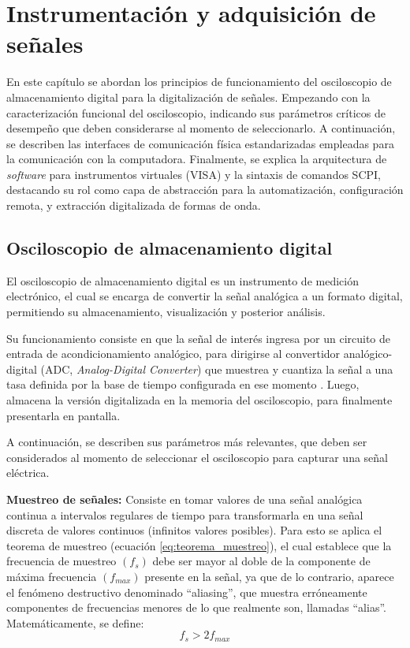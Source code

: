 \newpage
\chapter{Instrumentación y adquisición de señales}
\vspace{3\baselineskip}

En este capítulo se abordan los principios de funcionamiento del osciloscopio de almacenamiento digital para la digitalización de señales. Empezando con la caracterización funcional del osciloscopio, indicando sus parámetros críticos de desempeño que deben considerarse al momento de seleccionarlo. A continuación, se describen las interfaces de comunicación física estandarizadas empleadas para la comunicación con la computadora. Finalmente, se explica la arquitectura de \emph{software} para instrumentos virtuales (VISA) y la sintaxis de comandos SCPI, destacando su rol como capa de abstracción para la automatización, configuración remota, y extracción digitalizada de formas de onda.

\section{Osciloscopio de almacenamiento digital}
\vspace{3\baselineskip}

El osciloscopio de almacenamiento digital es un instrumento de medición electrónico, el cual se encarga de convertir la señal analógica a un formato digital, permitiendo su almacenamiento, visualización y posterior análisis.

Su funcionamiento consiste en que la señal de interés ingresa por un circuito de entrada de acondicionamiento analógico, para dirigirse al convertidor analógico-digital (ADC, \emph{Analog-Digital Converter}) que muestrea y cuantiza la señal a una tasa definida por la base de tiempo configurada en ese momento \cite{Floyd2006}. Luego, almacena la versión digitalizada en la memoria del osciloscopio, para finalmente presentarla en pantalla.

A continuación, se describen sus parámetros más relevantes, que deben ser considerados al momento de seleccionar el osciloscopio para capturar una señal eléctrica.

\textbf{Muestreo de señales:} Consiste en tomar valores de una señal analógica continua a intervalos regulares de tiempo para transformarla en una señal discreta de valores continuos (infinitos valores posibles). Para esto se aplica el teorema de muestreo (ecuación \ref{eq:teorema_muestreo}), el cual establece que la frecuencia de muestreo $(f_s)$ debe ser mayor al doble de la componente de máxima frecuencia $(f_{max})$ presente en la señal, ya que de lo contrario, aparece el fenómeno destructivo denominado \enquote{aliasing}, que muestra erróneamente componentes de frecuencias menores de lo que realmente son, llamadas “alias”. Matemáticamente, se define:
\begin{equation}
    f_s > 2 f_{max}
    \label{eq:teorema_muestreo}
\end{equation}

